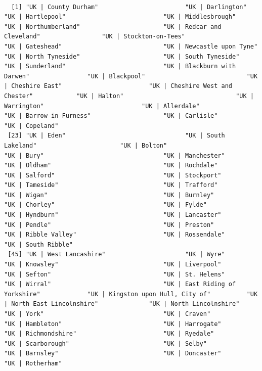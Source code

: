 \documentclass[11pt]{article}
\begin{document}
\begin{verbatim}

  [1] "UK | County Durham"                        "UK | Darlington"                           "UK | Hartlepool"                           "UK | Middlesbrough"                        "UK | Northumberland"                       "UK | Redcar and Cleveland"                 "UK | Stockton-on-Tees"                     "UK | Gateshead"                            "UK | Newcastle upon Tyne"                  "UK | North Tyneside"                       "UK | South Tyneside"                       "UK | Sunderland"                           "UK | Blackburn with Darwen"                "UK | Blackpool"                            "UK | Cheshire East"                        "UK | Cheshire West and Chester"            "UK | Halton"                               "UK | Warrington"                           "UK | Allerdale"                            "UK | Barrow-in-Furness"                    "UK | Carlisle"                             "UK | Copeland"                            
 [23] "UK | Eden"                                 "UK | South Lakeland"                       "UK | Bolton"                               "UK | Bury"                                 "UK | Manchester"                           "UK | Oldham"                               "UK | Rochdale"                             "UK | Salford"                              "UK | Stockport"                            "UK | Tameside"                             "UK | Trafford"                             "UK | Wigan"                                "UK | Burnley"                              "UK | Chorley"                              "UK | Fylde"                                "UK | Hyndburn"                             "UK | Lancaster"                            "UK | Pendle"                               "UK | Preston"                              "UK | Ribble Valley"                        "UK | Rossendale"                           "UK | South Ribble"                        
 [45] "UK | West Lancashire"                      "UK | Wyre"                                 "UK | Knowsley"                             "UK | Liverpool"                            "UK | Sefton"                               "UK | St. Helens"                           "UK | Wirral"                               "UK | East Riding of Yorkshire"             "UK | Kingston upon Hull, City of"          "UK | North East Lincolnshire"              "UK | North Lincolnshire"                   "UK | York"                                 "UK | Craven"                               "UK | Hambleton"                            "UK | Harrogate"                            "UK | Richmondshire"                        "UK | Ryedale"                              "UK | Scarborough"                          "UK | Selby"                                "UK | Barnsley"                             "UK | Doncaster"                            "UK | Rotherham"                           

\end{verbatim}
\end{document}
